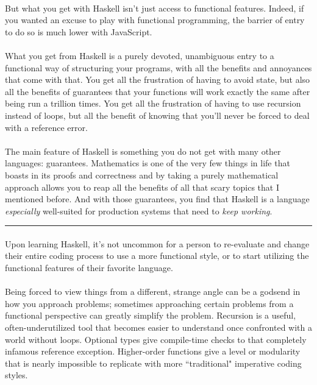 \begin{foreword}
\paragraph{}
But what you get with Haskell isn't just access to functional features.  Indeed, if you wanted an excuse to play with functional programming, the barrier of entry to do so is much lower with JavaScript.  

\paragraph{}
What you get from Haskell is a purely devoted, unambiguous entry to a functional way of structuring your programs, with all the benefits and annoyances that come with that. You get all the frustration of having to avoid state, but also all the benefits of guarantees that your functions will work exactly the same after being run a trillion times. You get all the frustration of having to use recursion instead of loops, but all the benefit of knowing that you'll never be forced to deal with a  reference error. 

\paragraph{}
The main feature of Haskell is something you do not get with many other languages: guarantees. Mathematics is one of the very few things in life that boasts in its proofs and correctness and by taking a purely mathematical approach allows you to reap all the benefits of all that scary topics that I mentioned before. 
And with those guarantees, you find that Haskell is a language \textit{especially} well-suited for production systems that need to \textit{keep working}.  

\rule{330pt}{1pt}

\paragraph{}
Upon learning Haskell, it's not uncommon for a person to re-evaluate and change their entire coding process to use a more functional style, or to start utilizing the functional features of their favorite language. 
\paragraph{}
Being forced to view things from a different, strange angle can be a godsend in how you approach problems; sometimes approaching certain problems from a functional perspective can greatly simplify the problem. Recursion is a useful, often-underutilized tool that becomes easier to understand once confronted with a world without loops. Optional types give compile-time checks to that completely infamous  reference exception. Higher-order functions give a level or modularity that is nearly impossible to replicate with more ``traditional" imperative coding styles. 


\end{foreword}
